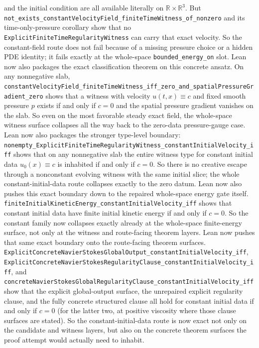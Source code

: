 \documentclass[11pt]{article}
\begin{document}
and the initial condition are all available literally on
\(\mathbb{R}\times\mathbb{R}^3\).  But
\texttt{not\_exists\_constantVelocityField\_finiteTimeWitness\_of\_nonzero} and
its time-only-pressure corollary show that no
\texttt{ExplicitFiniteTimeRegularityWitness} can carry that exact velocity.
So the constant-field route does not fail because of a missing pressure choice
or a hidden PDE identity; it fails exactly at the whole-space
\texttt{bounded\_energy\_on} slot.
Lean now also packages the exact classification theorem on this concrete
ansatz.  On any nonnegative slab,
\texttt{constantVelocityField\_finiteTimeWitness\_iff\_zero\_and\_spatialPressureGradient\_zero}
shows that a witness with velocity \(u(t,x)\equiv c\) and fixed smooth
pressure \(p\) exists if and only if \(c=0\) and the spatial pressure gradient
vanishes on the slab.  So even on the most favorable steady exact field, the
whole-space witness surface collapses all the way back to the zero-data
pressure-gauge case.
Lean now also packages the stronger type-level boundary:
\texttt{nonempty\_ExplicitFiniteTimeRegularityWitness\_constantInitialVelocity\_iff}
shows that on any nonnegative slab the entire witness type for constant initial
data \(u_0(x)\equiv c\) is inhabited if and only if \(c=0\).  So there is no
creative escape through a nonconstant evolving witness with the same initial
slice; the whole constant-initial-data route collapses exactly to the zero
datum.
Lean now also pushes this exact boundary down to the repaired whole-space
energy gate itself.  \texttt{finiteInitialKineticEnergy\_constantInitialVelocity\_iff}
shows that constant initial data have finite initial kinetic energy if and only
if \(c=0\).  So the constant family now collapses exactly already at the
whole-space finite-energy surface, not only at the witness and route-facing
theorem layers.
Lean now pushes that same exact boundary onto the route-facing theorem
surfaces.  \texttt{ExplicitConcreteNavierStokesGlobalOutput\_constantInitialVelocity\_iff},
\texttt{ExplicitConcreteNavierStokesRegularityClause\_constantInitialVelocity\_iff},
and \texttt{concreteNavierStokesGlobalRegularityClause\_constantInitialVelocity\_iff}
show that the explicit global-output surface, the unrepaired explicit
regularity clause, and the fully concrete structured clause all hold for
constant initial data if and only if \(c=0\) (for the latter two, at positive
viscosity where those clause surfaces are stated).  So the constant-initial-data
route is now exact not only on the candidate and witness layers, but also on
the concrete theorem surfaces the proof attempt would actually need to inhabit.
\end{document}
